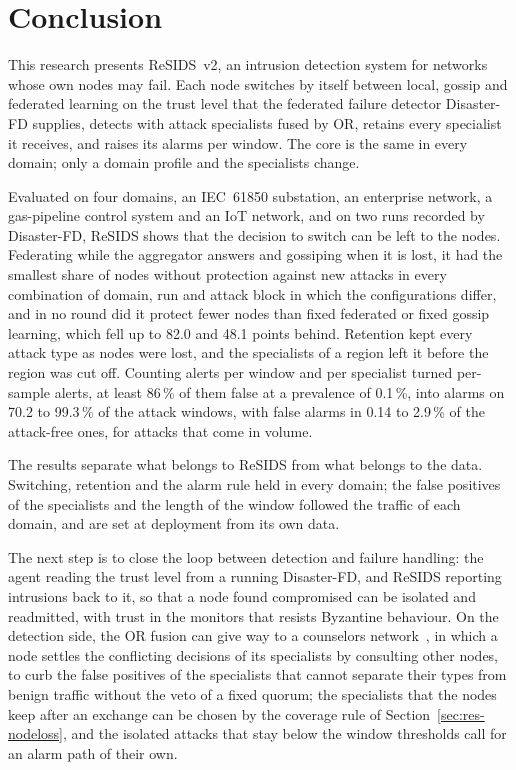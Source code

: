 \section{Conclusion}
\label{sec:conclusion}

This research presents ReSIDS~v2, an intrusion detection system for networks whose own nodes may fail. Each node switches by itself between local, gossip and federated learning on the trust level that the federated failure detector Disaster-FD supplies, detects with attack specialists fused by OR, retains every specialist it receives, and raises its alarms per window. The core is the same in every domain; only a domain profile and the specialists change.

Evaluated on four domains, an IEC~61850 substation, an enterprise network, a gas-pipeline control system and an IoT network, and on two runs recorded by Disaster-FD, ReSIDS shows that the decision to switch can be left to the nodes. Federating while the aggregator answers and gossiping when it is lost, it had the smallest share of nodes without protection against new attacks in every combination of domain, run and attack block in which the configurations differ, and in no round did it protect fewer nodes than fixed federated or fixed gossip learning, which fell up to 82.0 and 48.1 points behind. Retention kept every attack type as nodes were lost, and the specialists of a region left it before the region was cut off. Counting alerts per window and per specialist turned per-sample alerts, at least 86\,\% of them false at a prevalence of 0.1\,\%, into alarms on 70.2 to 99.3\,\% of the attack windows, with false alarms in 0.14 to 2.9\,\% of the attack-free ones, for attacks that come in volume.

The results separate what belongs to ReSIDS from what belongs to the data. Switching, retention and the alarm rule held in every domain; the false positives of the specialists and the length of the window followed the traffic of each domain, and are set at deployment from its own data.

The next step is to close the loop between detection and failure handling: the agent reading the trust level from a running Disaster-FD, and ReSIDS reporting intrusions back to it, so that a node found compromised can be isolated and readmitted, with trust in the monitors that resists Byzantine behaviour. On the detection side, the OR fusion can give way to a counselors network~\cite{quincozes2021counselors}, in which a node settles the conflicting decisions of its specialists by consulting other nodes, to curb the false positives of the specialists that cannot separate their types from benign traffic without the veto of a fixed quorum; the specialists that the nodes keep after an exchange can be chosen by the coverage rule of Section~\ref{sec:res-nodeloss}, and the isolated attacks that stay below the window thresholds call for an alarm path of their own.
